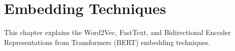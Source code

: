 
\chapter{Embedding Techniques}
\label{chap:embedding:techniques}

This chapter explains the Word2Vec, FastText, and Bidirectional Encoder
Representations from Transformers (BERT) embedding techniques.






